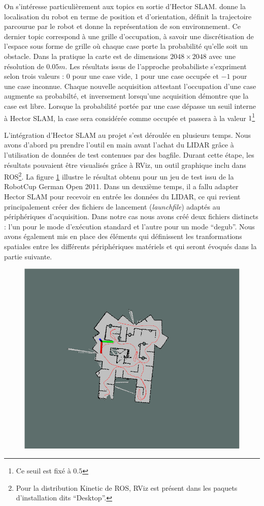 On s'intéresse particulièrement aux topics en sortie d'\gls{Hector SLAM}. 
 donne la localisation du robot en terme de position et d'orientation,  définit la trajectoire parcourue par le robot et  donne la représentation de son environnement. 
Ce dernier topic correspond à une grille d'occupation, à savoir une discrétisation de l'espace sous forme de grille où chaque case porte la probabilité qu'elle soit un obstacle.
Dans la pratique la carte est de dimensions $2048 \times{2048}$ avec une résolution de $0.05m$. Les résultats issus de l'approche probabiliste s'expriment selon trois valeurs : $0$ pour une case vide, $1$ pour une case occupée et $-1$ pour une case inconnue. 
Chaque nouvelle acquisition attestant l'occupation d'une case augmente sa probabilté, et inversement lorsqu'une acquisition démontre que la case est libre.
Lorsque la probabilité portée par une case dépasse un seuil interne à \gls{Hector SLAM}, la case sera considérée comme occupée et passera à la valeur $1$\footnote{Ce seuil est fixé à $0.5$}

L'intégration d'\gls{Hector SLAM} au projet s'est déroulée en plusieurs temps.
Nous avons d'abord pu prendre l'outil en main avant l'achat du \gls{LIDAR} grâce à l'utilisation de données de test contenues par des \gls{bagfile}. 
Durant cette étape, les résultats pouvaient être visualisés grâce à RViz, un outil graphique inclu dans \gls{ROS}\footnote{Pour la distribution Kinetic de ROS, RViz est présent dans les paquets d'installation dits ``Desktop''\cite{Bib_ROS_install}.}.
La figure \ref{fig:rviz} illustre le résultat obtenu pour un jeu de test issu de la RobotCup German Open 2011. 
Dans un deuxième temps, il a fallu adapter \gls{Hector SLAM} pour recevoir en entrée les données du \gls{LIDAR}, ce qui revient principalement créer des fichiers de lancement (\emph{launchfile})
adaptés au périphériques d'acquisition. Dans notre cas nous avons créé deux fichiers distincts : l'un pour le mode d'exécution standard et l'autre pour un mode ``degub''.
Nous avons également mis en place des éléments qui définissent les tranformations spatiales entre les différents périphériques matériels et qui seront évoqués dans la partie suivante. 

\begin{figure}[h]
  \centering
    \includegraphics[width=.4\linewidth]{figures/rviz}  
  \label{fig:rviz}
\end{figure}

